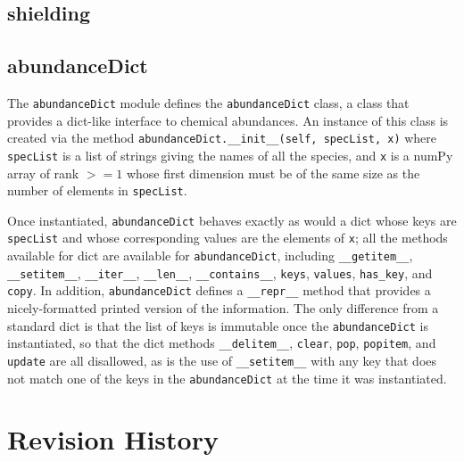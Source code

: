 \documentclass[12pt]{article}
\begin{document}
\subsection{shielding}
\label{sec:shielding}

\clearpage

\subsection{abundanceDict}
\label{sec:abundancedict}

The \verb=abundanceDict= module defines the \verb=abundanceDict= class, a class that provides a dict-like interface to chemical abundances. An instance of this class is created via the method \verb=abundanceDict.__init__(self, specList, x)= where \verb=specList= is a list of strings giving the names of all the species, and \verb=x= is a numPy array of rank $>=1$ whose first dimension must be of the same size as the number of elements in \verb=specList=. 

Once instantiated, \verb=abundanceDict= behaves exactly as would a dict whose keys are \verb=specList= and whose corresponding values are the elements of \verb=x=; all the methods available for dict are available for \verb=abundanceDict=, including \verb=__getitem__=, \verb=__setitem__=, \verb=__iter__=, \verb=__len__=, \verb=__contains__=, \verb=keys=, \verb=values=, \verb=has_key=, and \verb=copy=. In addition, \verb=abundanceDict= defines a \verb=__repr__= method that provides a nicely-formatted printed version of the information. The only difference from a standard dict is that the list of keys is immutable once the \verb=abundanceDict= is instantiated, so that the dict methods \verb=__delitem__=, \verb=clear=, \verb=pop=, \verb=popitem=, and \verb=update= are all disallowed, as is the use of \verb=__setitem__= with any key that does not match one of the keys in the \verb=abundanceDict= at the time it was instantiated.

\clearpage

\section{Revision History}
\end{document}
